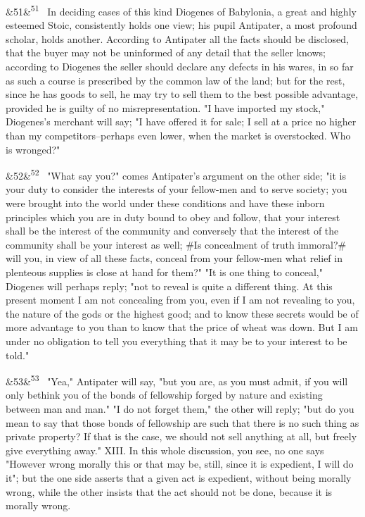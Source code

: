 \documentclass[12pt]{article}
\newcommand{\para}[1][]{\par\noindent\ifx&#1&\else\textsuperscript{\footnotesize #1}~\fi}
\begin{document}
\para[51] In deciding cases of this kind Diogenes of Babylonia, a great and highly esteemed Stoic, consistently holds one view; his pupil Antipater, a most profound scholar, holds another. According to Antipater all the facts should be disclosed, that the buyer may not be uninformed of any detail that the seller knows; according to Diogenes the seller should declare any defects in his wares, in so far as such a course is prescribed by the common law of the land; but for the rest, since he has goods to sell, he may try to sell them to the best possible advantage, provided he is guilty of no misrepresentation. "I have imported my stock," Diogenes's merchant will say; "I have offered it for sale; I sell at a price no higher than my competitors--perhaps even lower, when the market is overstocked. Who is wronged?"

\para[52] "What say you?" comes Antipater's argument on the other side; "it is your duty to consider the interests of your fellow-men and to serve society; you were brought into the world under these conditions and have these inborn principles which you are in duty bound to obey and follow, that your interest shall be the interest of the community and conversely that the interest of the community shall be your interest as well; \#Is concealment of truth immoral?\# will you, in view of all these facts, conceal from your fellow-men what relief in plenteous supplies is close at hand for them?" "It is one thing to conceal," Diogenes will perhaps reply; "not to reveal is quite a different thing. At this present moment I am not concealing from you, even if I am not revealing to you, the nature of the gods or the highest good; and to know these secrets would be of more advantage to you than to know that the price of wheat was down. But I am under no obligation to tell you everything that it may be to your interest to be told."

\para[53] "Yea," Antipater will say, "but you are, as you must admit, if you will only bethink you of the bonds of fellowship forged by nature and existing between man and man." "I do not forget them," the other will reply; "but do you mean to say that those bonds of fellowship are such that there is no such thing as private property? If that is the case, we should not sell anything at all, but freely give everything away." XIII. In this whole discussion, you see, no one says "However wrong morally this or that may be, still, since it is expedient, I will do it"; but the one side asserts that a given act is expedient, without being morally wrong, while the other insists that the act should not be done, because it is morally wrong.
\end{document}
